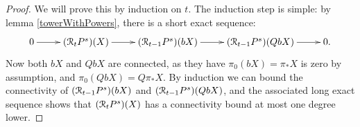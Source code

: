 \documentclass[11pt]{amsart}
\theoremstyle{plain}
\theoremstyle{definition}
\newcommand{\calR}{\mathcal{R}}
\theoremstyle{plain}
\newcommand{\caldup}[1]{\calR_{\smash{#1}}}
\newcommand{\barConstructionMightAbbreviate}{b}
\begin{document}
\begin{BK spec seq}
\begin{connectivity}
\begin{proof}
We will prove this by induction on $t$. The induction step is simple: %
by lemma \ref{towerWithPowers}, there is a short exact sequence:
\[\xymatrix{
0\ar[r]&
(\caldup{t}P^{s})(X)\ar[r]&
(\caldup{t-1}P^{s})(\barConstructionMightAbbreviate X)\ar[r]&
(\caldup{t-1}P^{s})(Q\barConstructionMightAbbreviate X)\ar[r]&
0.
}\]
Now both $\barConstructionMightAbbreviate X$ and $Q\barConstructionMightAbbreviate X$ are connected, as they have $\pi_0(\barConstructionMightAbbreviate X)=\pi_*X$ is zero by assumption, and $\pi_0(Q\barConstructionMightAbbreviate X)=Q\pi_*X$. By induction we can bound the connectivity of $(\caldup{t-1}P^{s})(\barConstructionMightAbbreviate X)$ and $(\caldup{t-1}P^{s})(Q\barConstructionMightAbbreviate X)$, and the associated long exact sequence shows that $(\caldup{t}P^{s})(X)$ has a connectivity bound at most one degree lower.



\end{proof}
\end{connectivity}
\end{BK spec seq}
\end{document}
